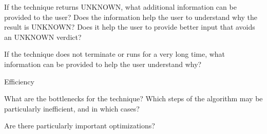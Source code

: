 \documentclass[a4paper]{article}
\begin{document}
\begin{minipage}[t]{0.16\linewidth}
\begin{betterlist}
\begin{betterlist}
			\item If the technique returns UNKNOWN, what additional information can be provided to the user? Does the information help the user to understand why the result is UNKNOWN? Does it help the user to provide better input that avoids an UNKNOWN verdict?

			\item If the technique does not terminate or runs for a very long time, what information can be provided to help the user understand why?

		\end{betterlist}
		\item \alert{Efficiency}
		\begin{betterlist}
			\item What are the bottlenecks for the technique? Which steps of the algorithm may be particularly inefficient, and in which cases?

			\item Are there particularly important optimizations?


\end{betterlist}
\end{betterlist}
\end{minipage}
\end{document}
